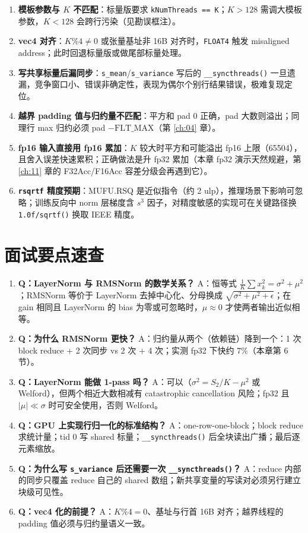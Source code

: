 \begin{enumerate}
  \item \textbf{模板参数与 $K$ 不匹配}：标量版要求 \texttt{kNumThreads == K}；$K > 128$ 需调大模板参数，$K < 128$ 会跨行污染（见勘误框注）。
  \item \textbf{vec4 对齐}：$K \% 4 \neq 0$ 或张量基址非 16B 对齐时，\texttt{FLOAT4} 触发 misaligned address；此时回退标量版或做尾部标量处理。
  \item \textbf{写共享标量后漏同步}：\texttt{s\_mean}/\texttt{s\_variance} 写后的 \texttt{\_\allowbreak{}\_\allowbreak{}syncthreads\allowbreak{}()} 一旦遗漏，竞争窗口小、错误非确定性，表现为偶尔个别行结果错误，极难复现定位。
  \item \textbf{越界 padding 值与归约量不匹配}：平方和 pad $0$ 正确，pad 大数则溢出；同理行 max 归约必须 pad $-\mathrm{FLT\_MAX}$（第 \ref{ch:04} 章）。
  \item \textbf{fp16 输入直接用 fp16 累加}：$K$ 较大时平方和可能溢出 fp16 上限（65504），且舍入误差快速累积；正确做法是升 fp32 累加（本章 fp32 演示天然规避，第 \ref{ch:11} 章的 F32Acc/F16Acc 容差分级会再遇到它）。
  \item \textbf{\texttt{rsqrtf} 精度预期}：MUFU.RSQ 是近似指令（约 2 ulp），推理场景下影响可忽略；训练反向中 norm 层梯度含 $s^3$ 因子，对精度敏感的实现可在关键路径换 \texttt{1.0f/\allowbreak{}sqrtf\allowbreak{}()} 换取 IEEE 精度。
\end{enumerate}

\section{面试要点速查}

\begin{enumerate}
  \item \textbf{Q：LayerNorm 与 RMSNorm 的数学关系？} A：恒等式 $\frac{1}{K}\sum x_k^2 = \sigma^2 + \mu^2$；RMSNorm 等价于 LayerNorm 去掉中心化、分母换成 $\sqrt{\sigma^2+\mu^2+\epsilon}$；在 gain 相同且 LayerNorm 的 bias 为零或可忽略时，$\mu \approx 0$ 才使两者输出近似相等。
  \item \textbf{Q：为什么 RMSNorm 更快？} A：归约量从两个（依赖链）降到一个：1 次 block reduce + 2 次同步 vs 2 次 + 4 次；实测 fp32 下快约 $7\%$（本章第 6 节）。
  \item \textbf{Q：LayerNorm 能做 1-pass 吗？} A：可以（$\sigma^2 = S_2/K - \mu^2$ 或 Welford），但两个相近大数相减有 catastrophic cancellation 风险；fp32 且 $|\mu| \ll \sigma$ 时可安全使用，否则 Welford。
  \item \textbf{Q：GPU 上实现行归一化的标准结构？} A：one-row-one-block；block reduce 求统计量；tid 0 写 shared 标量；\texttt{\_\allowbreak{}\_\allowbreak{}syncthreads\allowbreak{}()} 后全块读出广播；最后逐元素缩放。
  \item \textbf{Q：为什么写 \texttt{s\_variance} 后还需要一次 \texttt{\_\allowbreak{}\_\allowbreak{}syncthreads\allowbreak{}()}？} A：reduce 内部的同步只覆盖 reduce 自己的 shared 数组；新共享变量的写读对必须另行建立块级可见性。
  \item \textbf{Q：vec4 化的前提？} A：$K \% 4 = 0$、基址与行首 16B 对齐；越界线程的 padding 值必须与归约量语义一致。
\end{enumerate}

